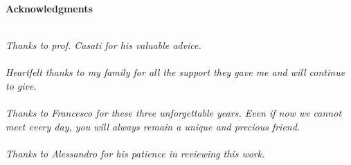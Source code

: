  \thispagestyle{empty}

\begin{center}
  {\bf \Huge Acknowledgments}
\end{center}

\vspace{4cm}


\emph{\\
  Thanks to prof. Casati for his valuable advice.\\ \\
  Heartfelt thanks to my family for all the support they gave me and will continue to give.\\ \\
  Thanks to Francesco for these three unforgettable years. Even if now we cannot meet every day, you will always remain a unique and precious friend.\\ \\
  Thanks to Alessandro for his patience in reviewing this work.\\
}